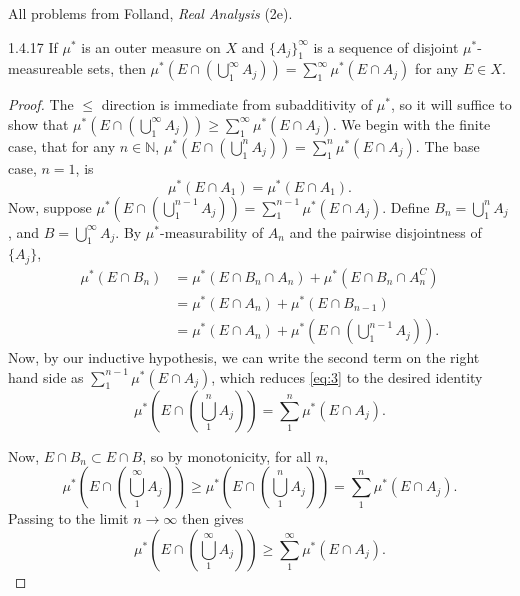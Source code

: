 \documentclass[11pt]{article}
\begin{document}
All problems from Folland, \textit{Real Analysis} (2e).
\begin{problem}{1.4.17}
	If \(\mu^{*}\) is an outer measure on \( X \) and \( \{A_j\}_1^{\infty} \) is a sequence of disjoint \( \mu^{*} \)-measureable sets, then \( \mu^{*}\left( E \cap (\bigcup_1^{\infty} A_j) \right) = \sum\limits_1^{\infty}\mu^{*}(E \cap A_j) \) for any \( E \in X \).
\end{problem}
\begin{proof}
	The \( \leq \) direction is immediate from subadditivity of \(\mu^{*}\), so it will suffice to show that \(\mu^{*}(E \cap (\bigcup_{1}^{\infty}A_j)) \geq \sum\limits_1^{\infty}\mu^{*}(E \cap A_j)\).
	We begin with the finite case, that for any \( n \in \mathbb{N} \), \(\mu^{*}(E \cap (\bigcup_1^n A_j)) = \sum\limits_1^n \mu^{*}(E \cap A_j)\).
	The base case, \( n=1 \), is
	\begin{equation}
		\label{eq:1}
		\mu^{*}(E \cap A_1) = \mu^{*}(E \cap A_1).
	\end{equation}
	Now, suppose \(\mu^{*}(E \cap (\bigcup_1^{n-1} A_j)) = \sum\limits_1^{n-1} \mu^{*}(E \cap A_j)\).
	Define \( B_n = \bigcup_1^{n} A_j \), and \( B = \bigcup_1^{\infty} A_j \).
	By \(\mu^{*}\)-measurability of \( A_n \) and the pairwise disjointness of \( \{A_j\} \),
	\begin{equation}
		\label{eq:3}
		\begin{aligned}
			\mu^{*}(E \cap B_n) & = \mu^{*}(E \cap B_n \cap A_n) + \mu^{*}(E \cap B_n \cap A_n^C) \\
			                    & = \mu^{*}(E \cap A_n) + \mu^{*}(E \cap B_{n-1})                 \\
			                    & = \mu^{*}(E \cap A_n) + \mu^{*}(E \cap (\bigcup_1^{n-1}A_j)).
		\end{aligned}
	\end{equation}
	Now, by our inductive hypothesis, we can write the second term on the right hand side as \( \sum\limits_1^{n-1} \mu^{*}(E \cap A_j) \), which reduces \cref{eq:3} to the desired identity
	\begin{equation}
		\label{eq:4}
		\mu^{*}(E \cap (\bigcup_1^n A_j)) = \sum\limits_1^n \mu^{*}(E \cap A_j).
	\end{equation}

	Now, \( E \cap B_{n} \subset E \cap B \), so by monotonicity, for all \( n \),
	\begin{equation}
		\label{eq:5}
		\mu^{*}(E \cap (\bigcup_1^{\infty} A_j)) \geq \mu^{*}(E \cap (\bigcup_1^{n} A_j)) = \sum\limits_1^n \mu^{*}(E \cap A_j).
	\end{equation}
	Passing to the limit \( n \rightarrow \infty \) then gives
	\begin{equation}
		\label{eq:6}
		\mu^{*}(E \cap (\bigcup_1^{\infty} A_j)) \geq \sum\limits_1^{\infty} \mu^{*}(E \cap A_j).
	\end{equation}
\end{proof}
\end{document}
